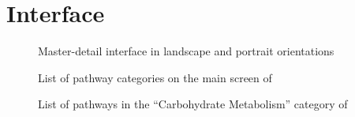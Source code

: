 \section{Interface}
\label{sect:kegg_interface}


\begin{figure}
    \caption{\label{fig:kegg_master_detail} Master-detail interface in landscape
    and portrait orientations}
\end{figure}

\begin{figure}
    \caption{\label{fig:kegg_screenshot_list} List of pathway categories on
    the main screen of \keggapp}
\end{figure}

\begin{figure}
    \caption{\label{fig:kegg_screenshot_sublist} List of pathways in the
    ``Carbohydrate Metabolism'' category of \keggapp}
\end{figure}

